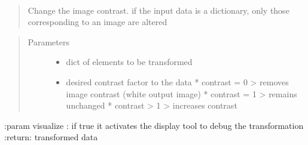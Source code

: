 \documentclass[letterpaper,10pt,english]{sphinxmanual}
\begin{document}

\begin{fulllineitems}
\label{\detokenize{ida_lib.operations:ida_lib.operations.transforms.change_contrast}}~\begin{quote}

Change the image contrast. if the input data is a dictionary, only those corresponding to an image are altered
\end{quote}
\begin{quote}\begin{description}
\item[{Parameters}] \leavevmode\begin{itemize}
\item {} 
 \textendash{} dict of elements to be transformed

\item {} 
 \textendash{} desired contrast factor to the data
* contrast = 0 \sphinxhyphen{}\textgreater{} removes image contrast (white output image)
* contrast = 1 \sphinxhyphen{}\textgreater{} remains unchanged
* contrast \textgreater{} 1 \sphinxhyphen{}\textgreater{} increases contrast

\end{itemize}

\end{description}\end{quote}

:param visualize  : if true it activates the display tool to debug the transformation
:return: transformed data

\end{fulllineitems}

\end{document}
